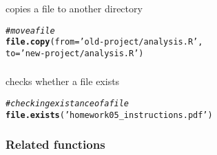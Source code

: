 \documentclass[12pt]{beamer}\usepackage[]{graphicx}\usepackage[]{color}
\makeatletter
\newcommand{\hlstr}[1]{\textcolor[rgb]{0.192,0.494,0.8}{#1}}%
\newcommand{\hlcom}[1]{\textcolor[rgb]{0.678,0.584,0.686}{\textit{#1}}}%
\newcommand{\hlstd}[1]{\textcolor[rgb]{0.345,0.345,0.345}{#1}}%
\newcommand{\hlkwc}[1]{\textcolor[rgb]{0.333,0.667,0.333}{#1}}%
\newcommand{\hlkwd}[1]{\textcolor[rgb]{0.737,0.353,0.396}{\textbf{#1}}}%
\newenvironment{kframe}{%
 \def\at@end@of@kframe{}%
 \ifinner\ifhmode%
  \def\at@end@of@kframe{\end{minipage}}%
  \begin{minipage}{\columnwidth}%
 \fi\fi%
 \def\FrameCommand##1{\hskip\@totalleftmargin \hskip-\fboxsep
 \colorbox{shadecolor}{##1}\hskip-\fboxsep
     \hskip-\linewidth \hskip-\@totalleftmargin \hskip\columnwidth}%
 \MakeFramed {\advance\hsize-\width
   \@totalleftmargin\z@ \linewidth\hsize
   \@setminipage}}%
 {\par\unskip\endMakeFramed%
 \at@end@of@kframe}
\newenvironment{knitrout}{}{} %
\makeatother
\begin{document}

\begin{frame}[fragile]
\frametitle{}

{\hilit {}} copies a file to another directory
\begin{knitrout}\footnotesize
{}\color{fgcolor}\begin{kframe}
\begin{alltt}
\hlcom{# move a file}
\hlkwd{file.copy}\hlstd{(}\hlkwc{from} \hlstd{=} \hlstr{'old-project/analysis.R'}\hlstd{,}
            \hlkwc{to} \hlstd{=} \hlstr{'new-project/analysis.R'}\hlstd{)}
\end{alltt}
\end{kframe}
\end{knitrout}

\end{frame}


\begin{frame}[fragile]
\frametitle{}

{\hilit {}} checks whether a file exists
\begin{knitrout}\footnotesize
{}\color{fgcolor}\begin{kframe}
\begin{alltt}
\hlcom{# checking existance of a file}
\hlkwd{file.exists}\hlstd{(}\hlstr{'homework05_instructions.pdf'}\hlstd{)}
\end{alltt}
\end{kframe}
\end{knitrout}

\end{frame}


\begin{frame}[fragile]
\frametitle{Related functions}

\bi
  \item {}
  \item {}
  \item {}
  \item {}
  \item {}
  \item {}
\ei

\end{frame}

\end{document}
